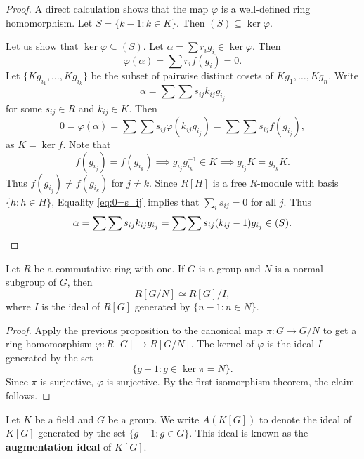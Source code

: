 \begin{proof}
    A direct calculation shows that the map $\varphi$ is a well-defined ring homomorphism. Let 
    $S=\{k-1:k\in K\}$. Then $(S)\subseteq \ker\varphi$. 
    
    Let us show that 
    $\ker\varphi\subseteq (S)$. Let $\alpha=\sum r_ig_i\in\ker\varphi$. Then 
    \[
    \varphi(\alpha)=\sum r_if(g_i)=0.
    \]
    Let 
    $\{Kg_{i_1},\dots,Kg_{i_k}\}$ be the subset of pairwise distinct cosets 
    of $Kg_1,\dots,Kg_n$. Write  
    \[
    \alpha=\sum\sum s_{ij}k_{ij}g_{i_j}
    \]
    for some $s_{ij}\in R$ and $k_{ij}\in K$. Then 
    \begin{equation}
    \label{eq:0=s_ij}
    0=\varphi(\alpha)=\sum\sum s_{ij}\varphi(k_{ij}g_{i_j})
    =\sum\sum s_{ij}f(g_{i_j}),
    \end{equation}
    as $K=\ker f$. Note that 
    \[
    f(g_{i_j})=f(g_{i_k})\implies 
    g_{i_j}g_{i_k}^{-1}\in K\implies 
    g_{i_j}K=g_{i_k}K.
    \]
    Thus $f(g_{i_j})\ne f(g_{i_k})$ for $j\ne k$. Since $R[H]$ is a free $R$-module 
    with basis $\{h:h\in H\}$, Equality
    \eqref{eq:0=s_ij}
    implies that $\sum_i s_{ij}=0$ for all $j$. Thus
    \[
    \alpha=\sum\sum s_{ij}k_{ij}g_{i_j}=\sum\sum s_{ij}(k_{ij}-1)g_{i_j}\in (S).\qedhere
    \]
\end{proof}

\begin{corollary}
\label{cor:R[G/N]}
    Let $R$ be a commutative ring with one. If 
    $G$ is a group and $N$ is a normal subgroup of $G$, then
    \[
    R[G/N]\simeq R[G]/I,
    \]
    where $I$ is the ideal of $R[G]$ generated by $\{n-1:n\in N\}$. 
\end{corollary}

\begin{proof}
    Apply the previous proposition to the canonical map $\pi\colon G\to G/N$ to get
    a ring homomorphism $\varphi\colon R[G]\to R[G/N]$. The kernel of $\varphi$ is the ideal $I$ 
    generated by the set 
    \[
    \{g-1:g\in\ker\pi=N\}.
    \]
    Since 
    $\pi$ is surjective, $\varphi$ is surjective. 
    By the first isomorphism theorem, the claim follows. 
\end{proof}

Let $K$ be a field and $G$ be a group. We write $A(K[G])$ to denote
the ideal of $K[G]$ generated by the set $\{g-1:g\in G\}$. This ideal is known as the
\textbf{augmentation ideal} of $K[G]$. 

